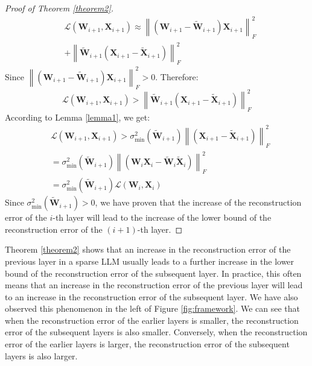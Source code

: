 \begin{proof}[Proof of Theorem \ref{theorem2}]
\begin{equation}
\begin{aligned}
&\mathcal{L}(\boldsymbol{W}_{i+1}, \boldsymbol{X}_{i+1}) \approx \left\lVert (\boldsymbol{W}_{i+1} - \widetilde{\boldsymbol{W}}_{i+1})\boldsymbol{X}_{i+1} \right\rVert_F^2 \\
&+ \left\lVert \widetilde{\boldsymbol{W}}_{i+1}(\boldsymbol{X}_{i+1} - \widetilde{\boldsymbol{X}}_{i+1}) \right\rVert_F^2
\end{aligned}
\end{equation}
Since \(\left\lVert (\boldsymbol{W}_{i+1} - \widetilde{\boldsymbol{W}}_{i+1})\boldsymbol{X}_{i+1} \right\rVert_F^2 > 0 \). Therefore:
\begin{equation}
\mathcal{L}(\boldsymbol{W}_{i+1}, \boldsymbol{X}_{i+1}) >  \left\lVert \widetilde{\boldsymbol{W}}_{i+1}(\boldsymbol{X}_{i+1} - \widetilde{\boldsymbol{X}}_{i+1}) \right\rVert_F^2 
\end{equation}
According to Lemma \ref{lemma1}, we get:
\begin{equation}
\begin{aligned}
&\mathcal{L}(\boldsymbol{W}_{i+1}, \boldsymbol{X}_{i+1}) >  \sigma_{\min}^2(\widetilde{\boldsymbol{W}}_{i+1}) \left\lVert (\boldsymbol{X}_{i+1} - \widetilde{\boldsymbol{X}}_{i+1}) \right\rVert_F^2 \\
&= \sigma_{\min}^2(\widetilde{\boldsymbol{W}}_{i+1}) \left\lVert (\boldsymbol{W}_{i}\boldsymbol{X}_{i} - \widetilde{\boldsymbol{W}}_{i}\widetilde{\boldsymbol{X}}_{i}) \right\rVert_F^2 \\
&=\sigma_{\min}^2(\widetilde{\boldsymbol{W}}_{i+1})\mathcal{L}(\boldsymbol{W}_{i}, \boldsymbol{X}_{i})
\end{aligned}
\end{equation}
Since \(\sigma_{\min}^2(\widetilde{\boldsymbol{W}}_{i+1}) > 0\), we have proven that the increase of the reconstruction error of the \(i\)-th layer will lead to the increase of the lower bound of the reconstruction error of the \((i+1)\)-th layer.
\end{proof}

Theorem \ref{theorem2} shows that an increase in the reconstruction error of the previous layer in a sparse LLM usually leads to a further increase in the lower bound of the reconstruction error of the subsequent layer. In practice, this often means that an increase in the reconstruction error of the previous layer will lead to an increase in the reconstruction error of the subsequent layer. We have also observed this phenomenon in the left of Figure \ref{fig:framework}. We can see that when the reconstruction error of the earlier layers is smaller, the reconstruction error of the subsequent layers is also smaller. Conversely, when the reconstruction error of the earlier layers is larger, the reconstruction error of the subsequent layers is also larger.

